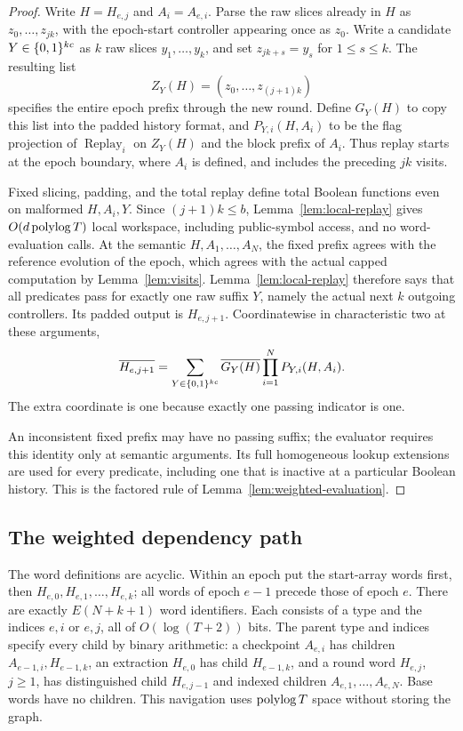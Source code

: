 \begin{proof}
Write \(H=H_{e,j}\) and \(A_i=A_{e,i}\).
Parse the raw slices already in \(H\) as
\(z_0,\ldots,z_{jk}\), with the epoch-start controller appearing once
as \(z_0\). Write a candidate \(Y\in\{0,1\}^{kc}\) as \(k\) raw slices
\(y_1,\ldots,y_k\), and set \(z_{jk+s}=y_s\) for \(1\le s\le k\).
The resulting list
\[
 Z_Y(H)=(z_0,\ldots,z_{(j+1)k})
\]
specifies the entire epoch prefix through the new round. Define
\(G_Y(H)\) to copy this list into the padded history format, and
\(P_{Y,i}(H,A_i)\) to be the flag projection of
\(\operatorname{Replay}_i\) on \(Z_Y(H)\) and the block prefix of
\(A_i\). Thus replay starts at the epoch boundary, where \(A_i\) is
defined, and includes the preceding \(jk\) visits.

Fixed slicing, padding, and the total replay define total Boolean
functions even on malformed \(H,A_i,Y\). Since \((j+1)k\le b\),
Lemma~\ref{lem:local-replay} gives \(O(d\operatorname{polylog} T)\) local workspace,
including public-symbol access, and no word-evaluation calls.
At the semantic \(H,A_1,\ldots,A_N\), the fixed prefix agrees with
the reference evolution of the epoch, which agrees with the actual
capped computation by Lemma~\ref{lem:visits}. Lemma~\ref{lem:local-replay}
therefore says that all predicates pass for exactly one raw suffix
\(Y\), namely the actual next \(k\) outgoing controllers. Its padded
output is \(H_{e,j+1}\). Coordinatewise in characteristic two at
these arguments,
\[
 \overline{H_{e,j+1}}
 =\sum_{Y\in\{0,1\}^{kc}}\overline{G_Y(H)}
       \prod_{i=1}^N P_{Y,i}(H,A_i).
\]
The extra coordinate is one because exactly one passing indicator
is one.

An inconsistent fixed prefix may have no passing suffix; the evaluator
requires this identity only at semantic arguments. Its full homogeneous
lookup extensions are used for every predicate, including one that is
inactive at a particular Boolean history. This is the factored rule
of Lemma~\ref{lem:weighted-evaluation}.
\end{proof}

\subsection{The weighted dependency path}
\label{sec:path}

The word definitions are acyclic. Within an epoch put the start-array
words first, then \(H_{e,0},H_{e,1},\ldots,H_{e,k}\); all words of
epoch \(e-1\) precede those of epoch \(e\).
There are exactly \(E(N+k+1)\) word identifiers. Each consists of a
type and the indices \(e,i\) or \(e,j\), all of \(O(\log(T+2))\) bits.
The parent type and indices specify every child by binary arithmetic:
a checkpoint \(A_{e,i}\) has children \(A_{e-1,i},H_{e-1,k}\), an
extraction \(H_{e,0}\) has child \(H_{e-1,k}\), and a round word
\(H_{e,j}\), \(j\ge1\), has distinguished child \(H_{e,j-1}\) and
indexed children \(A_{e,1},\ldots,A_{e,N}\). Base words have no children.
This navigation uses \(\operatorname{polylog} T\) space without storing the graph.


